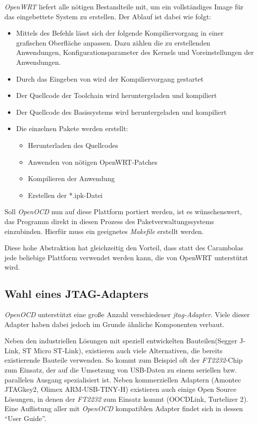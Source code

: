 \emph{OpenWRT} liefert alle nötigen Bestandteile mit, um ein vollständiges Image
für das eingebettete System zu erstellen.
Der Ablauf ist dabei wie folgt:
\begin{itemize}
  \item Mittels des Befehls  lässt sich der folgende
  Kompiliervorgang in einer grafischen Oberfläche anpassen. Dazu zählen die zu
  erstellenden Anwendungen, Konfigurationsparameter des Kernels und
  Voreinstellungen der Anwendungen.
  \item Durch das Eingeben von  wird der Kompiliervorgang
  gestartet
  \item Der Quellcode der Toolchain wird heruntergeladen und kompiliert
  \item Der Quellcode des Basissystems wird heruntergeladen und kompiliert
  \item Die einzelnen Pakete werden erstellt:
  \begin{itemize}
    \item Herunterladen des Quellcodes
    \item Anwenden von nötigen OpenWRT-Patches
    \item Kompilieren der Anwendung
    \item Erstellen der *.ipk-Datei
  \end{itemize}
\end{itemize}

Soll \emph{OpenOCD} nun auf diese Plattform portiert werden, ist es wünschenswert,
das Programm direkt in diesen Prozess des Paketverwaltungssystems einzubinden.
Hierfür muss ein geeignetes \emph{Makefile} erstellt werden.

Diese hohe Abstraktion hat gleichzeitig den Vorteil, dass statt des Carambolas
jede beliebige Plattform verwendet werden kann, die von OpenWRT unterstützt
wird.

\subsection{Wahl eines JTAG-Adapters}
\emph{OpenOCD} unterstützt eine große Anzahl verschiedener \emph{\gls{jtag}-Adapter}.
Viele dieser Adapter haben dabei jedoch im Grunde ähnliche Komponenten verbaut.

Neben den industriellen Lösungen mit speziell entwickelten Bauteilen(Segger
J-Link\cite{SEG}, ST Micro ST-Link\cite{STM01}), existieren auch viele
Alternativen, die bereits existierende Bauteile verwenden. So kommt zum Beispiel oft der
\emph{FT2232}-Chip zum Einsatz, der auf die Umsetzung von USB-Daten zu einem
seriellen bzw. parallelen Ausgang spezialisiert ist. Neben kommerziellen
Adaptern (Amontec JTAGkey2\cite{AMO}, Olimex ARM-USB-TINY-H\cite{OLI})
existieren auch einige Open Source Lösungen, in denen der \emph{FT2232} zum
Einsatz kommt (OOCDLink\cite{OCDL}, Turtelizer 2\cite{TURT}). Eine Auflistung
aller mit \emph{OpenOCD} kompatiblen Adapter findet sich in dessen "`User Guide"'\cite{OOCD}.

